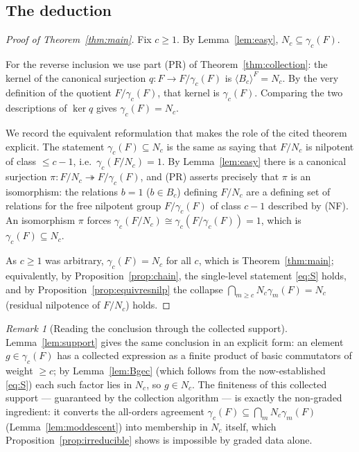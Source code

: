 \documentclass{amsart}
\theoremstyle{definition}
\theoremstyle{remark}
\newtheorem{remark}{Remark}
\begin{document}
\subsection*{The deduction}

\begin{proof}[Proof of Theorem~\ref{thm:main}]
Fix $c\ge1$. By Lemma~\ref{lem:easy}, $N_c\subseteq\gamma_c(F)$.

For the reverse inclusion we use part (PR) of Theorem~\ref{thm:collection}: the kernel of the
canonical surjection $q\colon F\to F/\gamma_c(F)$ is $\langle B_c\rangle^F=N_c$. By the very
definition of the quotient $F/\gamma_c(F)$, that kernel is $\gamma_c(F)$. Comparing the two
descriptions of $\ker q$ gives $\gamma_c(F)=N_c$.

We record the equivalent reformulation that makes the role of the cited theorem explicit.
The statement $\gamma_c(F)\subseteq N_c$ is the same as saying that $F/N_c$ is nilpotent of
class $\le c-1$, i.e.\ $\gamma_c(F/N_c)=1$. By Lemma~\ref{lem:easy} there is a canonical
surjection $\pi\colon F/N_c\twoheadrightarrow F/\gamma_c(F)$, and (PR) asserts precisely that
$\pi$ is an isomorphism: the relations $b=1$ ($b\in B_c$) defining $F/N_c$ are a defining set
of relations for the free nilpotent group $F/\gamma_c(F)$ of class $c-1$ described by (NF). An
isomorphism $\pi$ forces $\gamma_c(F/N_c)\cong\gamma_c(F/\gamma_c(F))=1$, which is
$\gamma_c(F)\subseteq N_c$.

As $c\ge1$ was arbitrary, $\gamma_c(F)=N_c$ for all $c$, which is Theorem~\ref{thm:main};
equivalently, by Proposition~\ref{prop:chain}, the single-level statement \eqref{eq:S} holds,
and by Proposition~\ref{prop:equivresnilp} the collapse $\bigcap_{m\ge c}N_c\gamma_m(F)=N_c$
\textup{(}residual nilpotence of $F/N_c$\textup{)} holds.
\end{proof}

\begin{remark}[Reading the conclusion through the collected support]\label{rem:support-read}
Lemma~\ref{lem:support} gives the same conclusion in an explicit form: an element
$g\in\gamma_c(F)$ has a collected expression as a finite product of basic commutators of weight
$\ge c$; by Lemma~\ref{lem:Bgec} (which follows from the now-established \eqref{eq:S}) each such
factor lies in $N_c$, so $g\in N_c$. The finiteness of this collected support --- guaranteed by
the collection algorithm --- is exactly the non-graded ingredient: it converts the
all-orders agreement $\gamma_c(F)\subseteq\bigcap_m N_c\gamma_m(F)$ (Lemma~\ref{lem:moddescent})
into membership in $N_c$ itself, which Proposition~\ref{prop:irreducible} shows is impossible by
graded data alone.
\end{remark}
\end{document}
